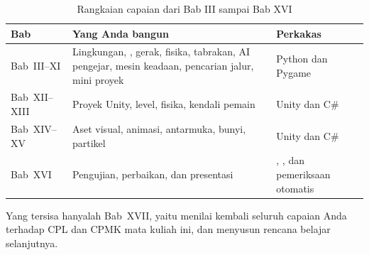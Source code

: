\begin{table}[htbp]
\centering
\caption{Rangkaian capaian dari Bab III sampai Bab XVI}
\label{tab:rangkaian-capaian}
{\setlength{\tabcolsep}{4pt}\footnotesize%
\begin{tabularx}{\textwidth}{@{}L{3.4cm} L{4.6cm} Y@{}}
\toprule
\headrow \textbf{Bab} & \textbf{Yang Anda bangun} & \textbf{Perkakas} \\
\midrule
Bab~III--XI & Lingkungan, , gerak, fisika, tabrakan, AI
pengejar, mesin keadaan, pencarian jalur, mini proyek &
Python dan Pygame \\
\addlinespace
Bab~XII--XIII & Proyek Unity, level, fisika, kendali pemain &
Unity dan C\# \\
\addlinespace
Bab~XIV--XV & Aset visual, animasi, antarmuka, bunyi, partikel &
Unity dan C\# \\
\addlinespace
Bab~XVI & Pengujian, perbaikan, dan presentasi &
, , dan pemeriksaan otomatis \\
\bottomrule
\end{tabularx}}
\end{table}

Yang tersisa hanyalah Bab~XVII, yaitu menilai kembali seluruh capaian Anda
terhadap CPL dan CPMK mata kuliah ini, dan menyusun rencana belajar
selanjutnya.
